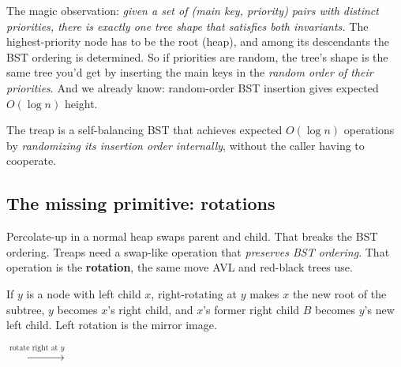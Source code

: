\documentclass[11pt]{article}
\begin{document}
The magic observation: \emph{given a set of (main key, priority) pairs with distinct priorities, there is exactly one tree shape that satisfies both invariants.} The highest-priority node has to be the root (heap), and among its descendants the BST ordering is determined. So if priorities are random, the tree's shape is the same tree you'd get by inserting the main keys in the \emph{random order of their priorities}. And we already know: random-order BST insertion gives expected $O(\log n)$ height.

The treap is a self-balancing BST that achieves expected $O(\log n)$ operations by \emph{randomizing its insertion order internally}, without the caller having to cooperate.

\subsection*{The missing primitive: rotations}

Percolate-up in a normal heap swaps parent and child. That breaks the BST ordering. Treaps need a swap-like operation that \emph{preserves BST ordering}. That operation is the \textbf{rotation}, the same move AVL and red-black trees use.

\begin{defnbox}
If $y$ is a node with left child $x$, right-rotating at $y$ makes $x$ the new root of the subtree, $y$ becomes $x$'s right child, and $x$'s former right child $B$ becomes $y$'s new left child. Left rotation is the mirror image.
\end{defnbox}

\begin{center}
\quad $\xrightarrow{\text{rotate right at } y}$ \quad
{}
\end{center}
\end{document}
